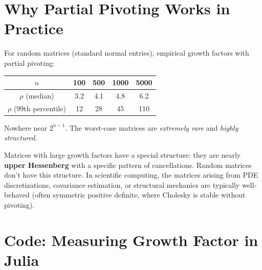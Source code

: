 \section{Why Partial Pivoting Works in Practice}
\label{sec:ge:practice}

\begin{example}
For random matrices (standard normal entries), empirical growth factors with partial pivoting:
\begin{center}
\begin{tabular}{c|cccc}
$n$ & 100 & 500 & 1000 & 5000 \\
\hline
$\rho$ (median) & 3.2 & 4.1 & 4.8 & 6.2 \\
$\rho$ (99th percentile) & 12 & 28 & 45 & 110
\end{tabular}
\end{center}
Nowhere near $2^{n-1}$. The worst-case matrices are \emph{extremely rare} and \emph{highly structured}.
\end{example}

\begin{remark}
Matrices with large growth factors have a special structure: they are nearly \textbf{upper Hessenberg} with a specific pattern of cancellations. Random matrices don't have this structure. In scientific computing, the matrices arising from PDE discretizations, covariance estimation, or structural mechanics are typically well-behaved (often symmetric positive definite, where Cholesky is stable without pivoting).
\end{remark}

\section{Code: Measuring Growth Factor in Julia}
\label{sec:ge:code}

